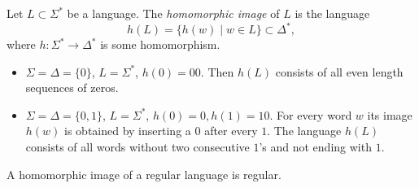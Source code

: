 \begin{page}
\setcounter{section}{3}
\setcounter{subsection}{3}
\setcounter{dfn}{10}
\label{portion:1144}

\begin{dfn}
Let $L \subset \Sigma^*$ be a language. The \emph{homomorphic image} of $L$ is the language
\[
h(L) = \{h(w) \mid w \in L\} \subset \Delta^*,
\]
where $h \colon \Sigma^* \to \Delta^*$ is some homomorphism.
\end{dfn}

\end{page}

\begin{page}
\setcounter{section}{3}
\setcounter{subsection}{3}
\setcounter{dfn}{11}
\label{portion:1147}

\begin{exl}
\begin{itemize}
\item
$\Sigma = \Delta = \{0\}$, $L = \Sigma^*$, $h(0) = 00$. Then $h(L)$ consists of all even length sequences of zeros.
\item
$\Sigma = \Delta = \{0, 1\}$, $L = \Sigma^*$, $h(0) = 0, h(1) = 10$. For every word $w$ its image $h(w)$ is obtained by inserting a $0$ after every $1$.
The language $h(L)$ consists of all words without two consecutive $1$'s and not ending with $1$.
\end{itemize}
\end{exl}

\end{page}

\begin{page}
\setcounter{section}{3}
\setcounter{subsection}{3}
\setcounter{dfn}{12}
\label{portion:1150}

\begin{thm}
A homomorphic image of a regular language is regular.
\end{thm}

\end{page}


